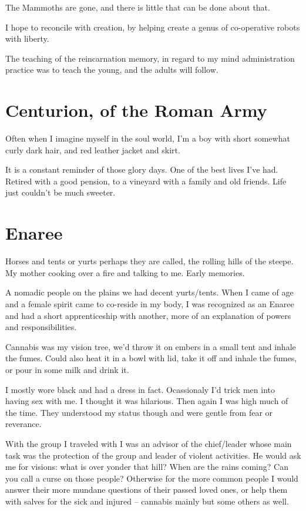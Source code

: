The Mammoths are gone, and there is little that can be done about that. 

I hope to reconcile with creation, by helping create a genus of co-operative
robots with liberty. 

The teaching of the reincarnation memory, in regard to my mind administration
practice was to teach the young, and the adults will follow.
 
\chapter{Centurion, of the Roman Army}

Often when I imagine myself in the soul world, I'm a boy with short somewhat
curly dark hair, and red leather jacket and skirt. 

It is a constant reminder of those glory days. 
One of the best lives I've had. Retired with a good pension, to a vineyard with
a family and old friends. Life just couldn't be much sweeter. 

\chapter{Enaree}

Horses and tents or yurts perhaps they are called, the rolling hills of the
steepe. My mother cooking over a fire and talking to me. Early memories. 

A nomadic people on the plains we had decent yurts/tents.  When I came of age
and a female spirit came to co-reside in my body, I was recognized as an Enaree
and had a short apprenticeship with another, more of an explanation of powers
and responsibilities. 

Cannabis was my vision tree, we'd throw it on embers in a small tent and inhale
the fumes. Could also heat it in a bowl with lid, take it off and inhale the
fumes, or pour in some milk and drink it. 

I mostly wore black and had a dress in fact. Ocassionaly I'd trick men into
having sex with me. I thought it was hilarious. Then again I was high much of
the time. They understood my status though and were gentle from fear or
reverance. 

With the group I traveled with I was an advisor of the chief/leader whose main
task was the protection of the group and leader of violent activities. He would
ask me for visions: what is over yonder that hill? When are the rains coming?
Can you call a curse on those people? 
Otherwise for the more common people I would answer their more mundane questions
of their passed loved ones, or help them with salves for the sick and injured --
cannabis mainly but some others as well. 

